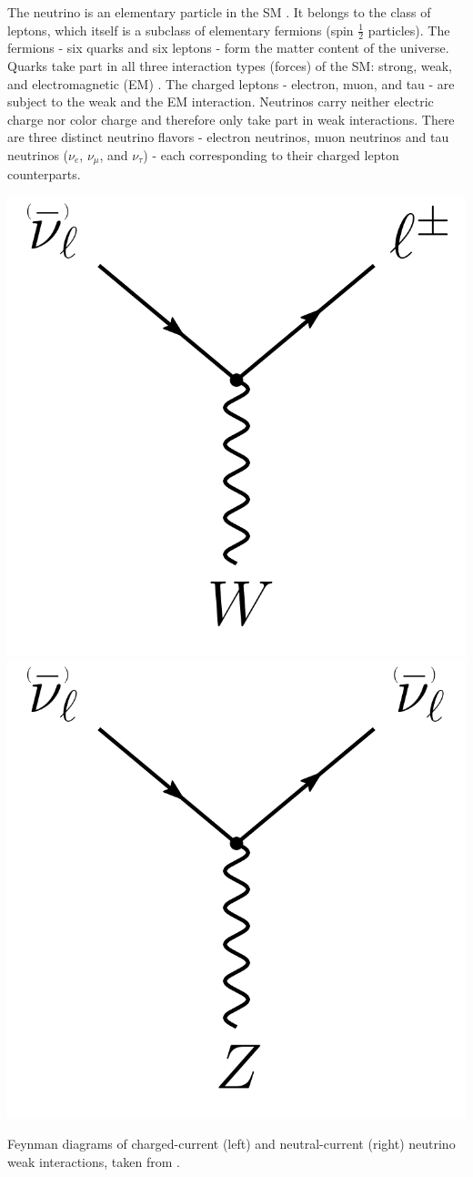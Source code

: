 The neutrino is an elementary particle in the SM .
It belongs to the class of leptons, which itself is a subclass of elementary fermions (spin ${\frac{1}{2}}$ particles).
The fermions - six quarks and six leptons - form the matter content of the universe.
Quarks take part in all three interaction types (forces) of the SM: strong, weak, and electromagnetic (EM) .
The charged leptons - electron, muon, and tau - are subject to the weak and the EM interaction.
Neutrinos carry neither electric charge nor color charge and therefore only take part in weak interactions.
There are three distinct neutrino flavors - electron neutrinos, muon neutrinos and tau neutrinos ($\nu_e$, $\nu_{\mu}$, and $\nu_{\tau}$)  - each corresponding to their charged lepton counterparts.

\begin{marginfigure}
	\centering
    \includegraphics[width=0.49\linewidth]{figures/neutrinos_properties/feynman_CC_nu.pdf}
    \includegraphics[width=0.49\linewidth]{figures/neutrinos_properties/feynman_NC_nu.pdf}
    \caption[Feynman diagrams of neutrino weak interactions]{Feynman diagrams of charged-current (left) and neutral-current (right) neutrino weak interactions, taken from \cite{ATerliuk}.}
\end{marginfigure}

